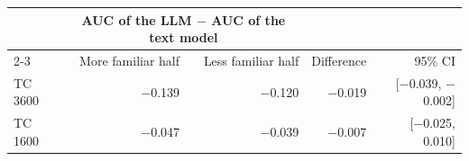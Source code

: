 \begin{tabular}{lrrrr}
\toprule
 & \multicolumn{2}{c}{AUC of the LLM $-$ AUC of the text model} & & \\
\cmidrule(lr){2-3}
 & More familiar half & Less familiar half & Difference & 95\% CI \\
\midrule
TC 3600 & $-$0.139 & $-$0.120 & $-$0.019 & [$-$0.039, $-$0.002] \\
TC 1600 & $-$0.047 & $-$0.039 & $-$0.007 & [$-$0.025, 0.010] \\
\bottomrule
\end{tabular}
